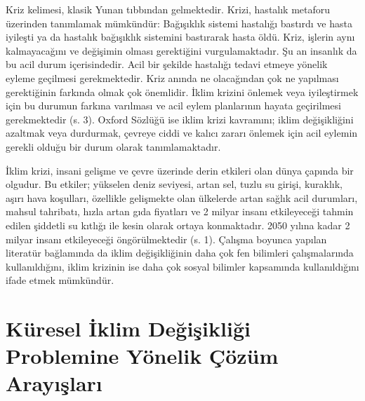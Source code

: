 \documentclass[
]{book}
\begin{document}
Kriz kelimesi, klasik Yunan tıbbından gelmektedir. Krizi, hastalık metaforu üzerinden tanımlamak mümkündür: Bağışıklık sistemi hastalığı bastırdı ve hasta iyileşti ya da hastalık bağışıklık sistemini bastırarak hasta öldü. Kriz, işlerin aynı kalmayacağını ve değişimin olması gerektiğini vurgulamaktadır. Şu an insanlık da bu acil durum içerisindedir. Acil bir şekilde hastalığı tedavi etmeye yönelik eyleme geçilmesi gerekmektedir. Kriz anında ne olacağından çok ne yapılması gerektiğinin farkında olmak çok önemlidir. İklim krizini önlemek veya iyileştirmek için bu durumun farkına varılması ve acil eylem planlarının hayata geçirilmesi gerekmektedir (s. 3). \citep{byrne2021} Oxford Sözlüğü ise iklim krizi kavramını; iklim değişikliğini azaltmak veya durdurmak, çevreye ciddi ve kalıcı zararı önlemek için acil eylemin gerekli olduğu bir durum olarak tanımlamaktadır. \citep{oxfordlearnersdict_climatecrisis}

İklim krizi, insani gelişme ve çevre üzerinde derin etkileri olan dünya çapında bir olgudur. Bu etkiler; yükselen deniz seviyesi, artan sel, tuzlu su girişi, kuraklık, aşırı hava koşulları, özellikle gelişmekte olan ülkelerde artan sağlık acil durumları, mahsul tahribatı, hızla artan gıda fiyatları ve 2 milyar insanı etkileyeceği tahmin edilen şiddetli su kıtlığı ile kesin olarak ortaya konmaktadır. 2050 yılına kadar 2 milyar insanı etkileyeceği öngörülmektedir (s. 1). \citep{pink2018climate} Çalışma boyunca yapılan literatür bağlamında da iklim değişikliğinin daha çok fen bilimleri çalışmalarında kullanıldığını, iklim krizinin ise daha çok sosyal bilimler kapsamında kullanıldığını ifade etmek mümkündür.

\hypertarget{kuxfcresel-iklim-deux11fiux15fikliux11fi-problemine-yuxf6nelik-uxe7uxf6zuxfcm-arayux131ux15flarux131}{%
\section{Küresel İklim Değişikliği Problemine Yönelik Çözüm Arayışları}\label{kuxfcresel-iklim-deux11fiux15fikliux11fi-problemine-yuxf6nelik-uxe7uxf6zuxfcm-arayux131ux15flarux131}}
\end{document}
